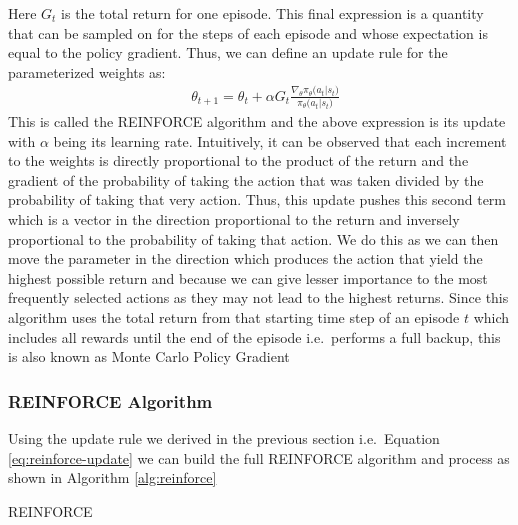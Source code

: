 \documentclass[12pt]{extarticle}
\numberwithin{equation}{section}
\begin{document}
	Here $G_t$ is the total return for one episode. This final expression is a quantity that can be sampled on for the steps of each episode and whose expectation is equal to the policy gradient. Thus, we can define an update rule for the parameterized weights as:
	\begin{align}
	&\theta_{t+1} = \theta_t + \alpha G_t\frac{\nabla_{\theta}\pi_{\theta}\big(a_t|s_t\big)}{\pi_{\theta}\big(a_t|s_t\big)} \label{eq:reinforce-update}
	\end{align}
	This is called the REINFORCE algorithm and the above expression is its update with $\alpha$ being its learning rate. Intuitively, it can be observed that each increment to the weights is directly proportional to the product of the return and the gradient of the probability of taking the action that was taken divided by the probability of taking that very action. Thus, this update pushes this second term which is a vector in the direction proportional to the return and inversely proportional to the probability of taking that action. We do this as we can then move the parameter in the direction which produces the action that yield the highest possible return and because we can give lesser importance to the most frequently selected actions as they may not lead to the highest returns. Since this algorithm uses the total return from that starting time step of an episode $t$ which includes all rewards until the end of the episode i.e.\ performs a full backup, this is also known as Monte Carlo Policy Gradient
	\subsubsection{REINFORCE Algorithm}\label{reinforce}
	Using the update rule we derived in the previous section i.e.\ Equation \ref{eq:reinforce-update} we can build the full REINFORCE algorithm and process as shown in Algorithm \ref{alg:reinforce}
	\begin{algorithm}
		\DontPrintSemicolon
		\SetAlgoLined
		\caption{REINFORCE}\label{alg:reinforce}
	\end{algorithm}
\end{document}
